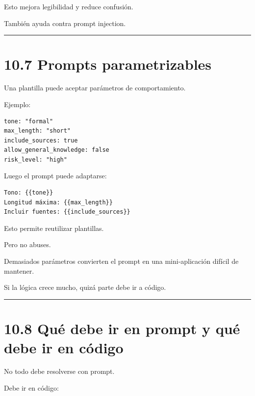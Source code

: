 Esto mejora legibilidad y reduce confusión.

También ayuda contra prompt injection.

\begin{center}\rule{0.5\linewidth}{0.5pt}\end{center}

\section{10.7 Prompts parametrizables}\label{prompts-parametrizables}

Una plantilla puede aceptar parámetros de comportamiento.

Ejemplo:

\begin{lstlisting}
tone: "formal"
max_length: "short"
include_sources: true
allow_general_knowledge: false
risk_level: "high"
\end{lstlisting}

Luego el prompt puede adaptarse:

\begin{lstlisting}
Tono: {{tone}}
Longitud máxima: {{max_length}}
Incluir fuentes: {{include_sources}}
\end{lstlisting}

Esto permite reutilizar plantillas.

Pero no abuses.

Demasiados parámetros convierten el prompt en una mini-aplicación
difícil de mantener.

Si la lógica crece mucho, quizá parte debe ir a código.

\begin{center}\rule{0.5\linewidth}{0.5pt}\end{center}

\section{10.8 Qué debe ir en prompt y qué debe ir en
código}\label{quuxe9-debe-ir-en-prompt-y-quuxe9-debe-ir-en-cuxf3digo}

No todo debe resolverse con prompt.

Debe ir en código:


